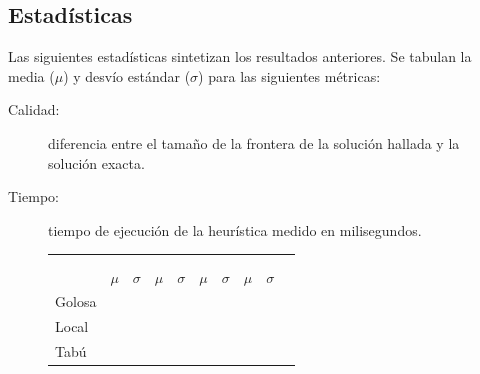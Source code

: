\documentclass[a4paper, 10pt, twoside]{article}
\begin{document}
\begin{figure}[H]
	
\end{figure}


\subsection{Estadísticas}

Las siguientes estadísticas sintetizan los resultados anteriores. Se tabulan la media ($\mu$) y desvío estándar ($\sigma$) para las siguientes métricas:

\begin{description}
	\item[Calidad:] diferencia entre el tamaño de la frontera de la solución hallada y la solución exacta.
	\item[Tiempo:] tiempo de ejecución de la heurística medido en milisegundos.
\end{description}



\begin{figure}[H]
	\begin{tabularx}{\textwidth}{ |>{\small}X| *9{ >{\small\centering}X|} }
		\hline
		 &
		 &
		\tabularnewline
		
		&
		 &
		 &
		 &
		\tabularnewline

		& $\mu$ & $\sigma$ & $\mu$ & $\sigma$ & $\mu$ & $\sigma$ & $\mu$ & $\sigma$
		\tabularnewline

		\hline
		Golosa &
		\golosaentrenamientocalidadmu &
		\golosaentrenamientocalidadsigma &
		\golosaentrenamientotiempomu &
		\golosaentrenamientotiemposigma &
		\golosatestingcalidadmu &
		\golosatestingcalidadsigma &
		\golosatestingtiempomu &
		\golosatestingtiemposigma
		\tabularnewline

		\hline
		Local &
		\localentrenamientocalidadmu &
		\localentrenamientocalidadsigma &
		\localentrenamientotiempomu &
		\localentrenamientotiemposigma &
		\localtestingcalidadmu &
		\localtestingcalidadsigma &
		\localtestingtiempomu &
		\localtestingtiemposigma
		\tabularnewline

		\hline
		Tabú &
		\tabuentrenamientocalidadmu &
		\tabuentrenamientocalidadsigma &
		\tabuentrenamientotiempomu &
		\tabuentrenamientotiemposigma &
		\tabutestingcalidadmu &
		\tabutestingcalidadsigma &
		\tabutestingtiempomu &
		\tabutestingtiemposigma
		\tabularnewline

		\hline
	\end{tabularx}
\end{figure}
\end{document}
